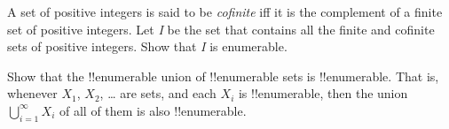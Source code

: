 \documentclass[../../../include/open-logic-section]{subfiles}
\begin{document}
\begin{prob}
A set of positive integers is said to be \emph{cofinite} iff
it is the complement of a finite set of positive integers. Let
\emph{I} be the set that contains all the finite and cofinite sets of
positive integers. Show that \emph{I} is enumerable.
\end{prob}

\begin{prob}
Show that the !!{enumerable} union of !!{enumerable} sets is
!!{enumerable}. That is, whenever $X_1$, $X_2$, \dots{} are sets, and
each $X_i$ is !!{enumerable}, then the union $\bigcup_{i=1}^\infty
X_i$ of all of them is also !!{enumerable}.
\end{prob}
\end{document}

